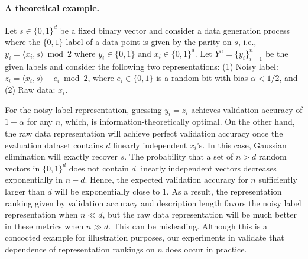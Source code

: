 \paragraph{A theoretical example.}
\label{sec:counter_ex}
Let $s \in \{0,1\}^d$ be a fixed binary vector and consider a data generation process where the $\{0,1\}$ label of a data point is given by the parity on $s$, i.e., $y_i = \langle x_i, s \rangle \bmod{2}$ where $y_i \in \{0,1\}$ and $x_i \in \{0,1\}^d$. Let $Y^n = \{y_i\}_{i=1}^n$ be the given labels and consider the following two representations: (1) Noisy label: $z_i = \langle x_i, s \rangle + e_i \bmod{2}$, where $e_i \in \{0,1\}$ is a random bit with bias $\alpha < 1/2$, and (2) Raw data: $x_i$.

For the noisy label representation, guessing $y_i = z_i$ achieves validation accuracy of $1-\alpha$ for any $n$, which, is information-theoretically optimal. On the other hand, the raw data representation will achieve perfect validation accuracy once the evaluation dataset contains $d$ linearly independent $x_i$'s. In this case, Gaussian elimination will exactly recover $s$. The probability that a set of $n > d$ random vectors in $\{0,1\}^d$ does not contain $d$ linearly independent vectors decreases exponentially in $n-d$. Hence, the expected validation accuracy for $n$ sufficiently larger than $d$ will be exponentially close to 1. As a result, the representation ranking given by validation accuracy and description length favors the noisy label representation when $n \ll d$, but the raw data representation will be much better in these metrics when $n \gg d$. This can be misleading.
Although this is a concocted example for illustration purposes, our experiments in  validate that dependence of representation rankings on $n$ does occur in practice.


